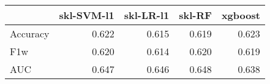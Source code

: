 \begin{tabular}{lrrrr}
\toprule
{} &  skl-SVM-l1 &  skl-LR-l1 &  skl-RF &  xgboost \\
\midrule
Accuracy &       0.622 &      0.615 &   0.619 &    0.623 \\
F1w      &       0.620 &      0.614 &   0.620 &    0.619 \\
AUC      &       0.647 &      0.646 &   0.648 &    0.638 \\
\bottomrule
\end{tabular}
